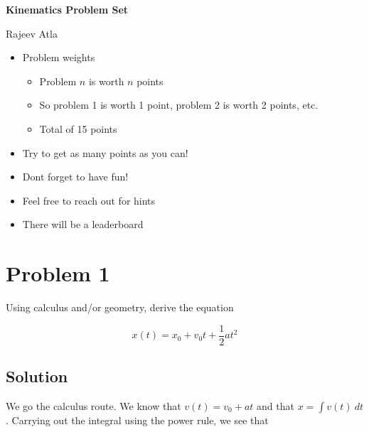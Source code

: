 \documentclass[11pt]{scrartcl}
\begin{document}
\titleformat{\section}{\normalfont\Large\bfseries}{\color{red}\S \thesection}{0.5em}{}
\titleformat{\subsection}{\normalfont\Large\bfseries}{\color{olive}\S \thesubsection}{0.5em}{}
\titleformat{\subsubsection}{\normalfont\Large\bfseries}{\color{blue}\S \thesubsubsection}{0.5em}{}

\begin{center}
    \Large \textbf{Kinematics Problem Set}
\end{center}
\begin{center}
    \Large Rajeev Atla
\end{center}

\begin{itemize}
    \item Problem weights
    \begin{itemize}
        \item Problem $n$ is worth $n$ points
        \item So problem 1 is worth 1 point, problem 2 is worth 2 points, etc.
        \item Total of 15 points
    \end{itemize}
    \item Try to get as many points as you can!
    \item Dont forget to have fun!
    \item Feel free to reach out for hints
    \item There will be a leaderboard
\end{itemize}

\newpage

\section{Problem 1}
Using calculus and/or geometry, derive the equation

$$
x(t) = x_0 + v_0 t + \frac{1}{2} at^2
$$

\subsection*{Solution}
We go the calculus route.
We know that $v(t) = v_0 + at$ and that $x = \int v(t)\ dt$.
Carrying out the integral using the power rule, we see that
\end{document}
